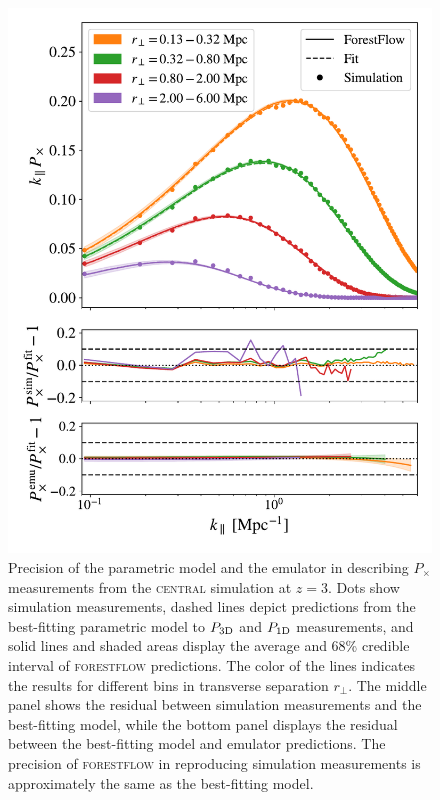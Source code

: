 \documentclass[fleqn,usenatbib]{mnras}
\newcommand{\pcross}{$P_{\times}$\xspace}
\newcommand{\poned}{\ensuremath{P_{\rm 1D}}\xspace}
\newcommand{\pthreed}{\ensuremath{P_{\rm 3D}}\xspace}
\newcommand{\forestflow}{\textsc{forestflow}\xspace}
\newcommand{\simcentral}{\textsc{central}\xspace}
\begin{document}
\begin{figure}
    \centering
    \includegraphics[width=.9\columnwidth]{figures/Pcross_central_snap6_kPx_allbin_emupred_first4_withfracerr.pdf}
    \caption{Precision of the parametric model and the emulator in describing \pcross measurements from the \simcentral simulation at $z=3$. Dots show simulation measurements, dashed lines depict predictions from the best-fitting parametric model to \pthreed and \poned measurements, and solid lines and shaded areas display the average and 68\% credible interval of \forestflow predictions. The color of the lines indicates the results for different bins in transverse separation $r_\perp$. The middle panel shows the residual between simulation measurements and the best-fitting model, while the bottom panel displays the residual between the best-fitting model and emulator predictions. The precision of \forestflow in reproducing simulation measurements is approximately the same as the best-fitting model.}
    \label{fig:Px_onesnap}
\end{figure}
\end{document}

